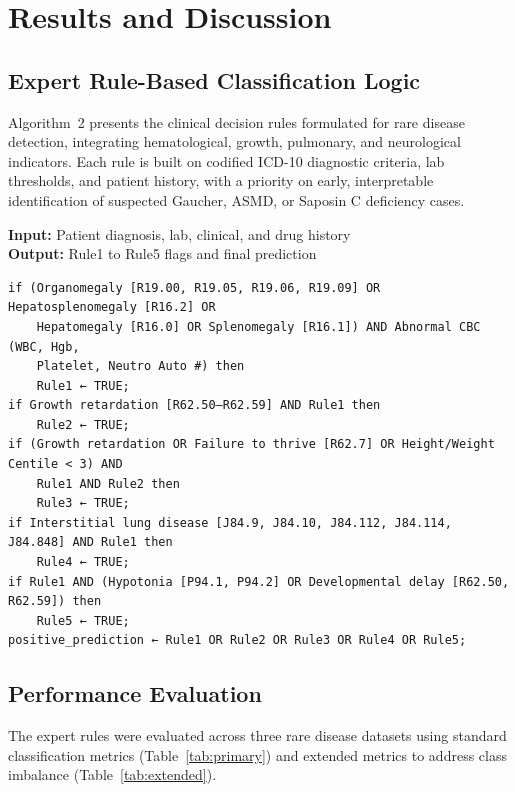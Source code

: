
\section{Results and Discussion}

\subsection{Expert Rule-Based Classification Logic}

Algorithm~2 presents the clinical decision rules formulated for rare disease detection, integrating hematological, growth, pulmonary, and neurological indicators. Each rule is built on codified ICD-10 diagnostic criteria, lab thresholds, and patient history, with a priority on early, interpretable identification of suspected Gaucher, ASMD, or Saposin C deficiency cases.

\begin{tcolorbox}[title=Algorithm 2: Expert Rules for Rare Disease Detection]
\textbf{Input:} Patient diagnosis, lab, clinical, and drug history \\
\textbf{Output:} Rule1 to Rule5 flags and final prediction

\begin{verbatim}
if (Organomegaly [R19.00, R19.05, R19.06, R19.09] OR Hepatosplenomegaly [R16.2] OR 
    Hepatomegaly [R16.0] OR Splenomegaly [R16.1]) AND Abnormal CBC (WBC, Hgb, 
    Platelet, Neutro Auto #) then
    Rule1 ← TRUE;
if Growth retardation [R62.50–R62.59] AND Rule1 then
    Rule2 ← TRUE;
if (Growth retardation OR Failure to thrive [R62.7] OR Height/Weight Centile < 3) AND 
    Rule1 AND Rule2 then
    Rule3 ← TRUE;
if Interstitial lung disease [J84.9, J84.10, J84.112, J84.114, J84.848] AND Rule1 then
    Rule4 ← TRUE;
if Rule1 AND (Hypotonia [P94.1, P94.2] OR Developmental delay [R62.50, R62.59]) then
    Rule5 ← TRUE;
positive_prediction ← Rule1 OR Rule2 OR Rule3 OR Rule4 OR Rule5;
\end{verbatim}
\end{tcolorbox}

\subsection{Performance Evaluation}

The expert rules were evaluated across three rare disease datasets using standard classification metrics (Table~\ref{tab:primary}) and extended metrics to address class imbalance (Table~\ref{tab:extended}).


